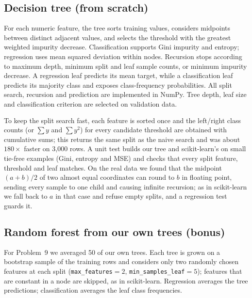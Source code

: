\documentclass[10pt,twocolumn,a4paper]{article}
\begin{document}
\subsection{Decision tree (from scratch)}
For each numeric feature, the tree sorts training values, considers
midpoints between distinct adjacent values, and selects the threshold
with the greatest weighted impurity decrease. Classification supports
Gini impurity and entropy; regression uses mean squared deviation within
nodes. Recursion stops according to maximum depth, minimum split and
leaf sample counts, or minimum impurity decrease. A regression leaf
predicts its mean target, while a classification leaf predicts its
majority class and exposes class-frequency probabilities. All split
search, recursion and prediction are implemented in NumPy. Tree depth,
leaf size and classification criterion are selected on validation data.

To keep the split search fast, each feature is sorted once and the
left/right class counts (or $\sum y$ and $\sum y^2$) for every candidate
threshold are obtained with cumulative sums; this returns the same split
as the naive search and was about $180\times$ faster on 3,000 rows.
A unit test builds our tree and scikit-learn's on small tie-free
examples (Gini, entropy and MSE) and checks that every split feature,
threshold and leaf matches. On the real data we found that the midpoint
$(a+b)/2$ of two almost equal coordinates can round to $b$ in floating
point, sending every sample to one child and causing infinite recursion;
as in scikit-learn we fall back to $a$ in that case and refuse empty
splits, and a regression test guards it.

\subsection{Random forest from our own trees (bonus)}
For Problem~9 we averaged 50 of our own trees. Each tree is grown on a
bootstrap sample of the training rows and considers only two randomly
chosen features at each split (\texttt{max\_features}$=2$,
\texttt{min\_samples\_leaf}$=5$); features that are constant in a node
are skipped, as in scikit-learn. Regression averages the tree
predictions; classification averages the leaf class frequencies.
\end{document}
